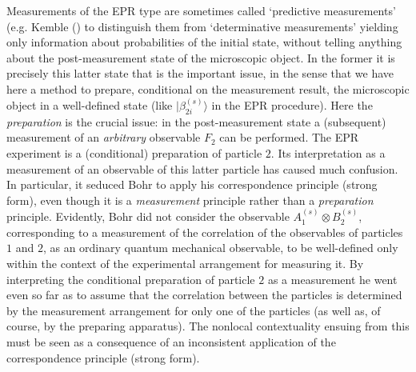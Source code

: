 \documentclass[12pt]{article}
\begin{document}
Measurements of the EPR type are sometimes called `predictive
measurements' (e.g. Kemble (\cite{Kemble}) to distinguish them
from `determinative measurements' yielding only information about
probabilities of the initial state, without telling anything about
the post-measurement state of the microscopic object. In the
former it is precisely this latter state that is the important
issue, in the sense that we have here a method to prepare,
conditional on the measurement result, the microscopic object in a
well-defined state (like $|\beta^{(s)}_{2i}\rangle$ in the EPR
procedure). Here the {\em preparation} is the crucial issue: in
the post-measurement state a (subsequent) measurement of an {\em
arbitrary} observable $F_2$ can be performed. The EPR experiment
is a (conditional) preparation of particle $2$. Its interpretation
as a measurement of an observable of this latter particle has
caused much confusion. In particular, it seduced Bohr to apply his
correspondence principle (strong form), even though it is a {\em
measurement} principle rather than a {\em preparation} principle.
Evidently, Bohr did not consider the observable $A_1^{(s)} \otimes
B_2^{(s)} $, corresponding to a measurement of the correlation of
the observables of particles $1$ and $2$, as an ordinary quantum
mechanical observable, to be well-defined only within the context
of the experimental arrangement for measuring it. By interpreting
the conditional preparation of particle $2$ as a measurement he
went even so far as to assume that the correlation between the
particles is determined by the measurement arrangement for only
one of the particles (as well as, of course, by the preparing
apparatus). The nonlocal contextuality ensuing from this must be
seen as a consequence of an inconsistent application of the
correspondence principle (strong form).
\end{document}
